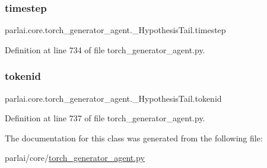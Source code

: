 \subsubsection{\texorpdfstring{timestep}{timestep}}
{\footnotesize\ttfamily parlai.\+core.\+torch\+\_\+generator\+\_\+agent.\+\_\+\+Hypothesis\+Tail.\+timestep}



Definition at line 734 of file torch\+\_\+generator\+\_\+agent.\+py.

\mbox{\label{classparlai_1_1core_1_1torch__generator__agent_1_1__HypothesisTail_a354a80abd13b7da3fd1d116c639a4f1a}} 
\subsubsection{\texorpdfstring{tokenid}{tokenid}}
{\footnotesize\ttfamily parlai.\+core.\+torch\+\_\+generator\+\_\+agent.\+\_\+\+Hypothesis\+Tail.\+tokenid}



Definition at line 737 of file torch\+\_\+generator\+\_\+agent.\+py.



The documentation for this class was generated from the following file\+:\begin{DoxyCompactItemize}
\item 
parlai/core/\hyperlink{torch__generator__agent_8py}{torch\+\_\+generator\+\_\+agent.\+py}\end{DoxyCompactItemize}
